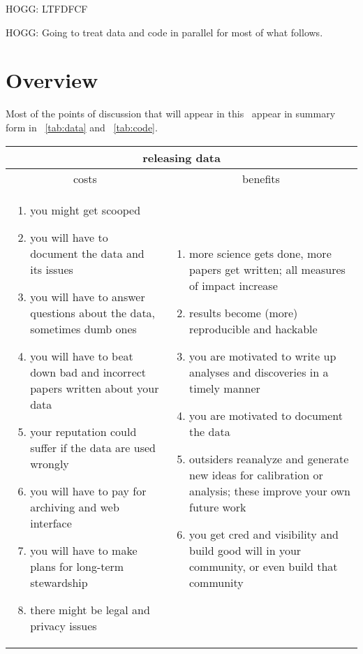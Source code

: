 \documentclass[12pt,twoside,pdftex]{article}
\begin{document}
HOGG: LTFDFCF

HOGG: Going to treat data and code in parallel for most of what follows.

\section{Overview}

Most of the points of discussion that will appear in this
\documentname\ appear in summary form in \tablename~\ref{tab:data} and
\tablename~\ref{tab:code}.%
\newlength{\cwidth}\setlength{\cwidth}{0.483\textwidth}%
\begin{table}%
\begin{tabular}{@{}p{\cwidth}|p{\cwidth}@{}}%
\multicolumn{2}{c}{\textbf{releasing data}} \\ \hline
\multicolumn{1}{c|}{costs} & \multicolumn{1}{c}{benefits} \\ \hline
\begin{enumerate}\raggedright
\item you might get scooped
\item you will have to document the data and its issues
\item you will have to answer questions about the data, sometimes dumb ones
\item you will have to beat down bad and incorrect papers written about your data
\item your reputation could suffer if the data are used wrongly
\item you will have to pay for archiving and web interface
\item you will have to make plans for long-term stewardship
\item there might be legal and privacy issues
\end{enumerate}&\begin{enumerate}\raggedright
\item more science gets done, more papers get written; all measures of impact increase
\item results become (more) reproducible and hackable
\item you are motivated to write up analyses and discoveries in a timely manner
\item you are motivated to document the data
\item outsiders reanalyze and generate new ideas for calibration or analysis; these improve your own future work
\item you get cred and visibility and build good will in your community, or even build that community

\end{enumerate}
\end{tabular}
\end{table}
\end{document}
